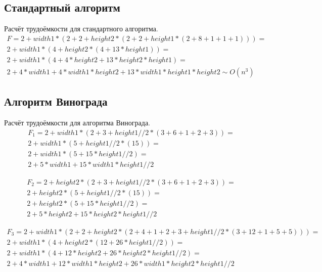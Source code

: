 \documentclass[a4paper,12pt]{report}
\begin{document}
	\newpage

	\subsection{Стандартный алгоритм}

        	Расчёт трудоёмкости для стандартного алгоритма.
        	\begin{multline*}
        		F = 2+width1*(2+2+height2*(2+2+height1*(2+8+1+1+1))) = \\ 2+width1*(4+height2*(4+13*height1)) = \\2+width1*(4+4*height2+13*height2*height1) =\\ 2+4*width1+4*width1*height2+13*width1*height1*height2 \sim O(n^{3})
        	\end{multline*}

	\subsection{Алгоритм Винограда}

        	Расчёт трудоёмкости для алгоритма Винограда.
        	\begin{multline*}
        		F_{1} = 2+width1*(2+3+height1//2*(3+6+1+2+3)) = \\2 + width1*(5+height1//2*(15)) =\\ 2+width1*(5+15*height1//2) =\\ 2+5*width1+15*width1*height1//2
        	\end{multline*}
        	
        	\begin{multline*}
        		F_{2} = 2+height2*(2+3+height1//2*(3+6+1+2+3)) = \\2 + height2*(5+height1//2*(15)) =\\ 2+height2*(5+15*height1//2) =\\ 2+5*height2+15*height2*height1//2
        	\end{multline*}
        	
        	\begin{multline*}
        		F_{3} = 2+width1*(2+2+height2*(2+4+1+2+3+height1//2*(3+12+1+5+5))) = \\2 + width1*(4+height2*(12+26*height1//2)) =\\ 2+width1*(4+12*height2+26*height2*height1//2) =\\ 2+4*width1+12*width1*height2+26*width1*height2*height1//2
        	\end{multline*}
			
\end{document}
